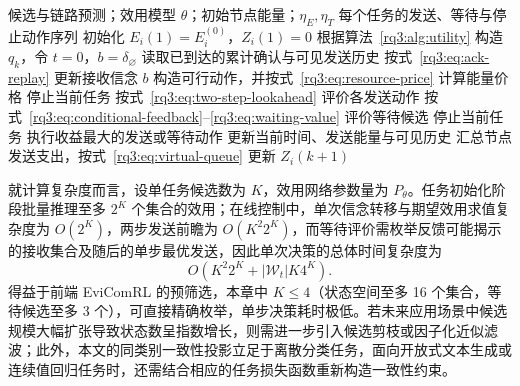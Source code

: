\begin{algorithm}[t]
  \label{rq3:alg:cbfc}
  \small
  \begin{algorithmic}[1]
    \Require 候选与链路预测；效用模型 $\theta$；初始节点能量；$\eta_E,\eta_T$
    \Ensure 每个任务的发送、等待与停止动作序列
    \State 初始化 $E_i(1)=E_i^{(0)}$，$Z_i(1)=0$
      \State 根据算法~\ref{rq3:alg:utility} 构造 $q_k$，令 $t=0$，$b=\delta_{\varnothing}$
        \State 读取已到达的累计确认与可见发送历史
        \State 按式~\eqref{rq3:eq:ack-replay} 更新接收信念 $b$
        \State 构造可行动作，并按式~\eqref{rq3:eq:resource-price} 计算能量价格
          \State 停止当前任务
        \Else
          \State 按式~\eqref{rq3:eq:two-step-lookahead} 评价各发送动作
          \State 按式~\eqref{rq3:eq:conditional-feedback}--\eqref{rq3:eq:waiting-value} 评价等待候选
            \State 停止当前任务
          \Else
            \State 执行收益最大的发送或等待动作
            \State 更新当前时间、发送能量与可见历史
          \EndIf
        \EndIf
      \EndWhile
      \State 汇总节点发送支出，按式~\eqref{rq3:eq:virtual-queue} 更新 $Z_i(k+1)$
    \EndFor
  \end{algorithmic}
\end{algorithm}

就计算复杂度而言，设单任务候选数为 $K$，效用网络参数量为 $P_\theta$。任务初始化阶段批量推理至多 $2^K$ 个集合的效用；在线控制中，单次信念转移与期望效用求值复杂度为 $O(2^K)$，两步发送前瞻为 $O(K^2 2^K)$，而等待评价需枚举反馈可能揭示的接收集合及随后的单步最优发送，因此单次决策的总体时间复杂度为
\begin{equation}
  O\left(K^2 2^K+|\mathcal W_t|K4^K\right).
  \label{rq3:eq:complexity}
\end{equation}
得益于前端 EviComRL 的预筛选，本章中 $K\le4$（状态空间至多 16 个集合，等待候选至多 3 个），可直接精确枚举，单步决策耗时极低。若未来应用场景中候选规模大幅扩张导致状态数呈指数增长，则需进一步引入候选剪枝或因子化近似滤波；此外，本文的同类别一致性投影立足于离散分类任务，面向开放式文本生成或连续值回归任务时，还需结合相应的任务损失函数重新构造一致性约束。

\FloatBarrier